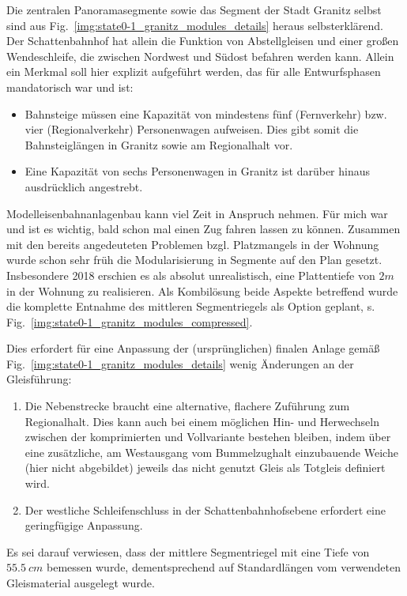 Die zentralen Panoramasegmente sowie das Segment der Stadt Granitz selbst sind aus Fig.~\ref{img:state0-1_granitz_modules_details} heraus selbsterkl\"arend.
Der Schattenbahnhof hat allein die Funktion von Abstellgleisen und einer gro{\ss}en Wendeschleife, die zwischen Nordwest und S\"udost befahren werden kann.
Allein ein Merkmal soll hier explizit aufgef\"uhrt werden, das f\"ur alle Entwurfsphasen mandatorisch war und ist:
\begin{itemize}
	\item Bahnsteige m\"ussen eine Kapazit\"at von mindestens f\"unf (Fernverkehr) bzw. vier  (Regionalverkehr) Personenwagen aufweisen.
	Dies gibt somit die Bahnsteigl\"angen in Granitz sowie am Regionalhalt vor.
	\item Eine Kapazit\"at von sechs Personenwagen in Granitz ist dar\"uber hinaus ausdr\"ucklich angestrebt.
\end{itemize}

Modelleisenbahnanlagenbau kann viel Zeit in Anspruch nehmen.
F\"ur mich war und ist es wichtig, bald schon mal einen Zug fahren lassen zu k\"onnen.
Zusammen mit den bereits angedeuteten Problemen bzgl. Platzmangels in der Wohnung wurde schon sehr fr\"uh die Modularisierung in Segmente auf den Plan gesetzt.
Insbesondere 2018 erschien es als absolut unrealistisch, eine Plattentiefe von $2m$ in der Wohnung zu realisieren.
Als Kombil\"osung beide Aspekte betreffend wurde die komplette Entnahme des mittleren Segmentriegels als Option geplant, s. Fig.~\ref{img:state0-1_granitz_modules_compressed}.

Dies erfordert f\"ur eine Anpassung der (urspr\"unglichen) finalen Anlage gem\"a{\ss} Fig.~\ref{img:state0-1_granitz_modules_details} wenig \"Anderungen an der Gleisf\"uhrung:
\begin{enumerate}
	\item Die Nebenstrecke braucht eine alternative, flachere Zuf\"uhrung zum Regionalhalt.
	Dies kann auch bei einem m\"oglichen Hin- und Herwechseln zwischen der komprimierten und Vollvariante bestehen bleiben, indem \"uber eine zus\"atzliche, am Westausgang vom Bummelzughalt einzubauende Weiche (hier nicht abgebildet) jeweils das nicht genutzt Gleis als Totgleis definiert wird.
	\item Der westliche Schleifenschluss in der Schattenbahnhofsebene erfordert eine geringf\"ugige Anpassung.
\end{enumerate}
Es sei darauf verwiesen, dass der mittlere Segmentriegel mit eine Tiefe von $55.5~cm$ bemessen wurde, dementsprechend auf Standardl\"angen vom verwendeten Gleismaterial ausgelegt wurde.

